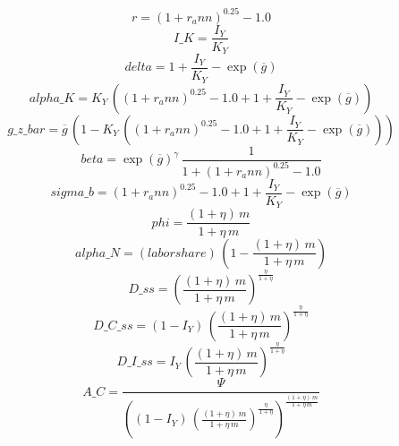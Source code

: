 \begin{dmath*}
r = \left(1+{{r_ann}}\right)^{0.25}-1.0
\end{dmath*}
\begin{dmath*}
I\_K = \frac{{{I_Y}}}{{{K_Y}}}
\end{dmath*}
\begin{dmath*}
delta = 1+\frac{{{I_Y}}}{{{K_Y}}}-\exp\left({{\overline{g}}}\right)
\end{dmath*}
\begin{dmath*}
alpha\_K = {{K_Y}}\, \left(\left(1+{{r_ann}}\right)^{0.25}-1.0+1+\frac{{{I_Y}}}{{{K_Y}}}-\exp\left({{\overline{g}}}\right)\right)
\end{dmath*}
\begin{dmath*}
g\_z\_bar = {{\overline{g}}}\, \left(1-{{K_Y}}\, \left(\left(1+{{r_ann}}\right)^{0.25}-1.0+1+\frac{{{I_Y}}}{{{K_Y}}}-\exp\left({{\overline{g}}}\right)\right)\right)
\end{dmath*}
\begin{dmath*}
beta = \exp\left({{\overline{g}}}\right)^{{{\gamma}}}\, \frac{1}{1+\left(1+{{r_ann}}\right)^{0.25}-1.0}
\end{dmath*}
\begin{dmath*}
sigma\_b = \left(1+{{r_ann}}\right)^{0.25}-1.0+1+\frac{{{I_Y}}}{{{K_Y}}}-\exp\left({{\overline{g}}}\right)
\end{dmath*}
\begin{dmath*}
phi = \frac{\left(1+{{\eta}}\right)\, {{m}}}{1+{{\eta}}\, {{m}}}
\end{dmath*}
\begin{dmath*}
alpha\_N = {(labor share)}\, \left(1-\frac{\left(1+{{\eta}}\right)\, {{m}}}{1+{{\eta}}\, {{m}}}\right)
\end{dmath*}
\begin{dmath*}
D\_ss = \left(\frac{\left(1+{{\eta}}\right)\, {{m}}}{1+{{\eta}}\, {{m}}}\right)^{\frac{{{\eta}}}{1+{{\eta}}}}
\end{dmath*}
\begin{dmath*}
D\_C\_ss = \left(1-{{I_Y}}\right)\, \left(\frac{\left(1+{{\eta}}\right)\, {{m}}}{1+{{\eta}}\, {{m}}}\right)^{\frac{{{\eta}}}{1+{{\eta}}}}
\end{dmath*}
\begin{dmath*}
D\_I\_ss = {{I_Y}}\, \left(\frac{\left(1+{{\eta}}\right)\, {{m}}}{1+{{\eta}}\, {{m}}}\right)^{\frac{{{\eta}}}{1+{{\eta}}}}
\end{dmath*}
\begin{dmath*}
A\_C = \frac{{{\Psi}}}{\left(\left(1-{{I_Y}}\right)\, \left(\frac{\left(1+{{\eta}}\right)\, {{m}}}{1+{{\eta}}\, {{m}}}\right)^{\frac{{{\eta}}}{1+{{\eta}}}}\right)^{\frac{\left(1+{{\eta}}\right)\, {{m}}}{1+{{\eta}}\, {{m}}}}}
\end{dmath*}
